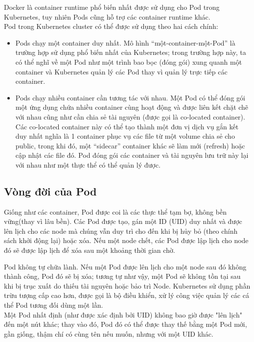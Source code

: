 \documentclass[14pt,a4paper]{book}
\begin{document}
				Docker là container runtime phổ biến nhất được sử dụng cho Pod trong Kubernetes, tuy nhiên Pods cũng hỗ trợ các container runtime khác.\\
				
				Pod trong Kubernetes cluster có thể được sử dụng theo hai cách chính:\\
				\begin{itemize}				
					\item Pods chạy một container duy nhất. Mô hình “một-container-một-Pod” là trường hợp sử dụng phổ biến nhất của Kubernetes; trong trường hợp này, ta có thể nghĩ về một Pod như một trình bao bọc (đóng gói) xung quanh một container và Kubernetes quản lý các Pod thay vì quản lý trực tiếp các container.
					\item Pods chạy nhiều container cần tương tác với nhau. Một Pod có thể đóng gói một ứng dụng chứa nhiều container cùng hoạt động và được liên kết chặt chẽ với nhau cũng như cần chia sẻ tài nguyên (được gọi là co-located container). Các co-located container này có thể tạo thành một đơn vị dịch vụ gắn kết duy nhất nghĩa là 1 container phục vụ các file từ một volume chia sẻ cho public, trong khi đó, một “sidecar” container khác sẽ làm mới (refresh) hoặc cập nhật các file đó. Pod đóng gói các container và tài nguyên lưu trữ này lại với nhau như một thực thể có thể quản lý được.
				\end{itemize}
			\subsection{Vòng đời của Pod}
				{\hspace{0.6cm}Giống như các container, Pod được coi là các thực thể tạm bợ, không bền vững(thay vì lâu bền). Các Pod được tạo, gán một ID (UID) duy nhất và được lên lịch cho các node mà chúng vẫn duy trì cho đến khi bị hủy bỏ (theo chính sách khởi động lại) hoặc xóa. Nếu một node chết, các Pod được lập lịch cho node đó sẽ được lập lịch để xóa sau một khoảng thời gian chờ.\\}
				
				Pod không tự chữa lành. Nếu một Pod được lên lịch cho một node sau đó không thành công, Pod đó sẽ bị xóa; tương tự như vậy, một Pod sẽ không tồn tại sau khi bị trục xuất do thiếu tài nguyên hoặc bảo trì Node. Kubernetes sử dụng phần trừu tượng cấp cao hơn, được gọi là bộ điều khiển, xử lý công việc quản lý các cá thể Pod tương đối dùng một lần.\\
				
				Một Pod nhất định (như được xác định bởi UID) không bao giờ được "lên lịch" đến một nút khác; thay vào đó, Pod đó có thể được thay thế bằng một Pod mới, gần giống, thậm chí có cùng tên nếu muốn, nhưng với một UID khác.\\
				
\end{document}
